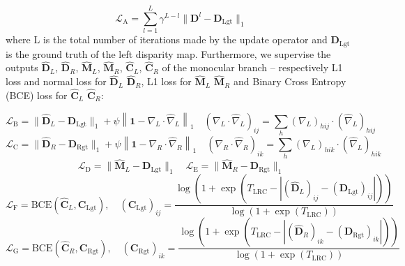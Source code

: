 \documentclass[10pt,twocolumn,letterpaper]{article}
\begin{document}
\small\begin{equation}
    \mathcal{L}_\text{A} = \sum_{l=1}^L{\gamma^{L-l}\lVert \mathbf{D}^l-\mathbf{D}_\text{Lgt} \rVert_1}
    \label{eq:loss_raft}
\end{equation}\normalsize
where L is the total number of iterations made by the update operator and $\mathbf{D}_\text{Lgt}$ is the ground truth of the left disparity map.
Furthermore, we supervise the outputs $\hat{\mathbf{D}}_L$, $\hat{\mathbf{D}}_R$, $\hat{\mathbf{M}}_L$, $\hat{\mathbf{M}}_R$, $\hat{\mathbf{C}}_L$, $\hat{\mathbf{C}}_R$ of the monocular branch -- respectively L1 loss and normal loss for $\hat{\mathbf{D}}_L$ $\hat{\mathbf{D}}_R$, L1 loss for $\hat{\mathbf{M}}_L$ $\hat{\mathbf{M}}_R$ and Binary Cross Entropy (BCE) loss for $\hat{\mathbf{C}}_L$ $\hat{\mathbf{C}}_R$:

\small\begin{equation}
    \mathcal{L}_\text{B} = \lVert \hat{\mathbf{D}}_L - \mathbf{D}_\text{Lgt} \rVert_1 + \psi \left\lVert \mathbf{1} - \nabla_L\cdot\hat{\nabla}_L \right\rVert_1 \quad \left( \nabla_L\cdot\hat{\nabla}_L \right)_{ij} = \sum_h (\nabla_L)_{hij} \cdot (\hat{\nabla}_L)_{hij}
    \label{eq:loss_coarse_disp_left}
\end{equation}\normalsize
\small\begin{equation}
    \mathcal{L}_\text{C} = \lVert \hat{\mathbf{D}}_R - \mathbf{D}_\text{Rgt} \rVert_1 + \psi \left\lVert \mathbf{1} - \nabla_R\cdot\hat{\nabla}_R \right\rVert_1 \quad \left( \nabla_R\cdot\hat{\nabla}_R \right)_{ik} = \sum_h (\nabla_L)_{hik} \cdot (\hat{\nabla}_L)_{hik}
    \label{eq:loss_coarse_disp_right}
\end{equation}\normalsize
\small\begin{equation}
    \mathcal{L}_\text{D} = \lVert \hat{\mathbf{M}}_L - \mathbf{D}_\text{Lgt} \rVert_1  \quad \mathcal{L}_\text{E} = \lVert \hat{\mathbf{M}}_R - \mathbf{D}_\text{Rgt} \rVert_1
    \label{eq:loss_scaled_disp}
\end{equation}\normalsize
\small\begin{equation}
    \mathcal{L}_\text{F} = \text{BCE}(\hat{\mathbf{C}}_L,\mathbf{C}_\text{Lgt}), \quad (\mathbf{C}_\text{Lgt})_{ij} = \frac{\log\left(1+\exp\left(T_\text{LRC}-\left| (\hat{\mathbf{D}}_L)_{ij} - (\mathbf{D}_\text{Lgt})_{ij}  \right|\right)\right)}{\log(1+\exp(T_\text{LRC}))}
    \label{eq:loss_coarse_conf_left}
\end{equation}\normalsize
\small\begin{equation}
    \mathcal{L}_\text{G} = \text{BCE}(\hat{\mathbf{C}}_R,\mathbf{C}_\text{Rgt}), \quad (\mathbf{C}_\text{Rgt})_{ik} = \frac{\log\left(1+\exp\left(T_\text{LRC}-\left| (\hat{\mathbf{D}}_R)_{ik} - (\mathbf{D}_\text{Rgt})_{ik}  \right|\right)\right)}{\log(1+\exp(T_\text{LRC}))}
    \label{eq:loss_coarse_conf_right}
\end{equation}\normalsize
\end{document}
